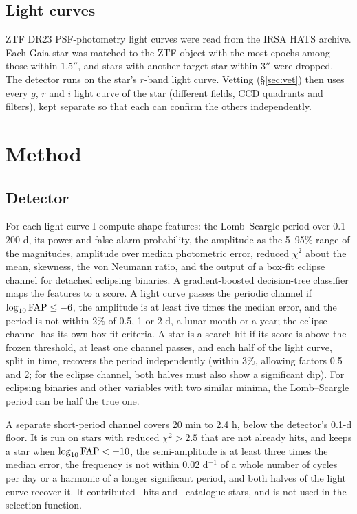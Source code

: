 \documentclass[twocolumn]{searchchev_preprint}
\begin{document}
\subsection{Light curves}
ZTF DR23 PSF-photometry light curves were read from the IRSA HATS archive. Each Gaia star was matched to the ZTF object with
the most epochs among those within $1.5''$, and stars with another target star within $3''$ were
dropped. The detector runs on the star's $r$-band light curve. Vetting (\S\ref{sec:vet}) then uses every $g$, $r$ and $i$
light curve of the star (different fields, CCD quadrants and filters), kept separate so that each can confirm the
others independently.

\section{Method}
\subsection{Detector}
For each light curve I compute shape features: the Lomb--Scargle \citep{Lomb1976,Scargle1982} period over 0.1--200 d,
its power and false-alarm probability, the amplitude as the 5--95\% range of the magnitudes, amplitude over median
photometric error, reduced $\chi^2$ about the mean, skewness, the von Neumann ratio, and the output of a box-fit
eclipse channel for detached eclipsing binaries. A gradient-boosted decision-tree classifier maps the features to a
score. A light curve passes the periodic channel if $\log_{10}{\rm FAP}\le-6$, the amplitude is at least five times the
median error, and the period is not within 2\% of 0.5, 1 or 2 d, a lunar month or a year; the eclipse channel has its
own box-fit criteria. A star is a search hit if its score is above the frozen threshold, at least one channel passes,
and each half of the light curve, split in time, recovers the period independently (within 3\%, allowing factors 0.5
and 2; for the eclipse channel, both halves must also show a significant dip). For eclipsing binaries and other variables with two similar minima, the Lomb--Scargle period can be half the
true one.

A separate short-period channel covers 20 min to 2.4 h, below the detector's 0.1-d floor. It is run on stars with
reduced $\chi^2>2.5$ that are not already hits, and keeps a star when $\log_{10}{\rm FAP}<-10$, the semi-amplitude is
at least three times the median error, the frequency is not within 0.02 d$^{-1}$ of a whole number of cycles per day
or a harmonic of a longer significant period, and both halves of the light curve recover it. It contributed
\nhitsshort\ hits and \nnABshort\ catalogue stars, and is not used in the selection function.
\end{document}
